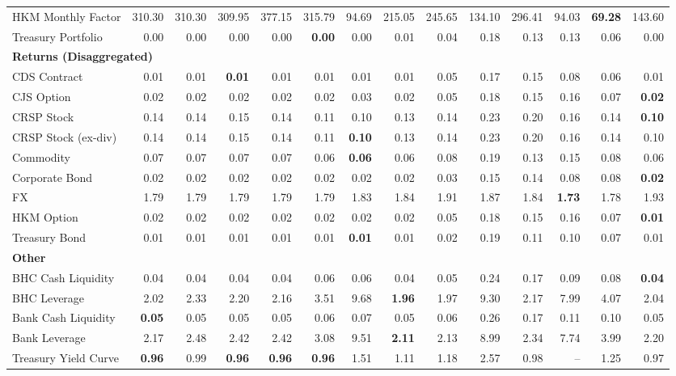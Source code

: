 \begin{table}[htbp]
\begin{tabular}{@{}lrrrrrrrrrrrrr@{}}
HKM Monthly Factor & 310.30 & 310.30 & 309.95 & 377.15 & 315.79 & 94.69 & 215.05 & 245.65 & 134.10 & 296.41 & 94.03 & \textbf{69.28} & 143.60 \\
Treasury Portfolio & 0.00 & 0.00 & 0.00 & 0.00 & \textbf{0.00} & 0.00 & 0.01 & 0.04 & 0.18 & 0.13 & 0.13 & 0.06 & 0.00 \\
\midrule
\multicolumn{14}{l}{\textbf{Returns (Disaggregated)}} \\
CDS Contract & 0.01 & 0.01 & \textbf{0.01} & 0.01 & 0.01 & 0.01 & 0.01 & 0.05 & 0.17 & 0.15 & 0.08 & 0.06 & 0.01 \\
CJS Option & 0.02 & 0.02 & 0.02 & 0.02 & 0.02 & 0.03 & 0.02 & 0.05 & 0.18 & 0.15 & 0.16 & 0.07 & \textbf{0.02} \\
CRSP Stock & 0.14 & 0.14 & 0.15 & 0.14 & 0.11 & 0.10 & 0.13 & 0.14 & 0.23 & 0.20 & 0.16 & 0.14 & \textbf{0.10} \\
CRSP Stock (ex-div) & 0.14 & 0.14 & 0.15 & 0.14 & 0.11 & \textbf{0.10} & 0.13 & 0.14 & 0.23 & 0.20 & 0.16 & 0.14 & 0.10 \\
Commodity & 0.07 & 0.07 & 0.07 & 0.07 & 0.06 & \textbf{0.06} & 0.06 & 0.08 & 0.19 & 0.13 & 0.15 & 0.08 & 0.06 \\
Corporate Bond & 0.02 & 0.02 & 0.02 & 0.02 & 0.02 & 0.02 & 0.02 & 0.03 & 0.15 & 0.14 & 0.08 & 0.08 & \textbf{0.02} \\
FX & 1.79 & 1.79 & 1.79 & 1.79 & 1.79 & 1.83 & 1.84 & 1.91 & 1.87 & 1.84 & \textbf{1.73} & 1.78 & 1.93 \\
HKM Option & 0.02 & 0.02 & 0.02 & 0.02 & 0.02 & 0.02 & 0.02 & 0.05 & 0.18 & 0.15 & 0.16 & 0.07 & \textbf{0.01} \\
Treasury Bond & 0.01 & 0.01 & 0.01 & 0.01 & 0.01 & \textbf{0.01} & 0.01 & 0.02 & 0.19 & 0.11 & 0.10 & 0.07 & 0.01 \\
\midrule
\multicolumn{14}{l}{\textbf{Other}} \\
BHC Cash Liquidity & 0.04 & 0.04 & 0.04 & 0.04 & 0.06 & 0.06 & 0.04 & 0.05 & 0.24 & 0.17 & 0.09 & 0.08 & \textbf{0.04} \\
BHC Leverage & 2.02 & 2.33 & 2.20 & 2.16 & 3.51 & 9.68 & \textbf{1.96} & 1.97 & 9.30 & 2.17 & 7.99 & 4.07 & 2.04 \\
Bank Cash Liquidity & \textbf{0.05} & 0.05 & 0.05 & 0.05 & 0.06 & 0.07 & 0.05 & 0.06 & 0.26 & 0.17 & 0.11 & 0.10 & 0.05 \\
Bank Leverage & 2.17 & 2.48 & 2.42 & 2.42 & 3.08 & 9.51 & \textbf{2.11} & 2.13 & 8.99 & 2.34 & 7.74 & 3.99 & 2.20 \\
Treasury Yield Curve & \textbf{0.96} & 0.99 & \textbf{0.96} & \textbf{0.96} & \textbf{0.96} & 1.51 & 1.11 & 1.18 & 2.57 & 0.98 & -- & 1.25 & 0.97 \\
\bottomrule
\end{tabular}
\vspace{0.1cm}

\end{table}
